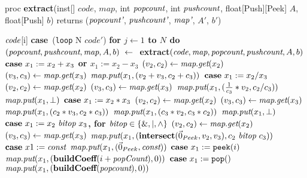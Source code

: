 \begin{algorithm}
proc {\bf extract}(inst[] $code$, \maptype $map$, int $\mbox{\it popcount}$, int $\mbox{\it pushcount}$, 
float[Push][Peek] $A$, float[Push] $b$) 
returns ($\mbox{\it popcount'}$, $\mbox{\it pushcount'}$, $\mbox{\it map'}$, $A'$, $b'$)
\begin{algorithmic}
 $\mbox{\it code}$[i]
\IND
\STATE \mbox{\bf case}~({\tt loop} N $code'$)
\IND
\STATE \bf{for} $j \leftarrow 1$ to $N$ {\bf do}
\IND
\STATE $(\mbox{\it popcount}, \mbox{\it pushcount}, \mbox{\it map}, A, b)~\leftarrow~$ \bf{extract}$(\mbox{\it code}, \mbox{\it map}, \mbox{\it popcount}, \mbox{\it pushcount}, A, b)$
\UND
\UND
\STATE \vspace{-6pt}
\STATE $\mbox{\bf case}~ x_1 := x_2 + x_3$ or $x_1 := x_2 - x_3$
\IND
\STATE $(v_2, c_2) \leftarrow \mbox{\it map}.\mbox{\it get}(x_2)$
\STATE $(v_3, c_3) \leftarrow \mbox{\it map}.\mbox{\it get}(x_3)$
\STATE $\mbox{\it map}.\mbox{\it put}(x_1, (v_2+v_3, c_2+c_3))$
\UND
\STATE \vspace{-6pt}
\STATE $\mbox{\bf case}~x_1 := x_2 / x_3$
\IND
\STATE $(v_2, c_2) \leftarrow \mbox{\it map}.\mbox{\it get}(x_2)$
\STATE $(v_3, c_3) \leftarrow \mbox{\it map}.\mbox{\it get}(x_3)$
\STATE $\mbox{\it map}.\mbox{\it put}(x_1, (\frac{1}{c_3}*v_2, c_2/c_3))$
\ELSE
\STATE $\mbox{\it map}.\mbox{\it put}(x_1, \bot)$
\ENDIF
\UND
\STATE \vspace{-6pt}
\STATE $\mbox{\bf case}~x_1 := x_2 * x_3$
\IND
\STATE $(v_2, c_2) \leftarrow \mbox{\it map}.\mbox{\it get}(x_2)$
\STATE $(v_3, c_3) \leftarrow \mbox{\it map}.\mbox{\it get}(x_3)$
\STATE $\mbox{\it map}.\mbox{\it put}(x_1, (c_2*v_3, c_2*c_3))$
\STATE $\mbox{\it map}.\mbox{\it put}(x_1, (c_3*v_2, c_3*c_2))$
\ELSE
\STATE $\mbox{\it map}.\mbox{\it put}(x_1, \bot)$
\ENDIF
\UND
\STATE \vspace{-6pt}
\STATE $\mbox{\bf case}~x_1 := x_2 ~\mbox{\it bitop}~ x_3$, for $\mbox{\it bitop} \in \{\&, |, \wedge\}$
\IND
\STATE $(v_2, c_2) \leftarrow \mbox{\it map}.\mbox{\it get}(x_2)$
\STATE $(v_3, c_3) \leftarrow \mbox{\it map}.\mbox{\it get}(x_3)$
\STATE $\mbox{\it map}.\mbox{\it put}(x_1, (\mbox{\bf intersect}(\vec 0_{Peek}, v_2, v_3), c_2 ~\mbox{\it bitop}~ c_3))$
\UND
\STATE \vspace{-6pt}
\STATE $\mbox{\bf case}~x1 := \mbox{\it const}$
\IND
\STATE $\mbox{\it map}.\mbox{\it put}(x_1, (\vec 0_{Peek}, \mbox{\it const}))$
\UND
\STATE \vspace{-6pt}
\STATE $\mbox{\bf case}~x_1 := \mbox{\tt peek}(i)$
\IND
\STATE $\mbox{\it map}.\mbox{\it put}(x_1, (\mbox{\bf buildCoeff}(i+\mbox{\it popCount}), 0))$
\UND
\STATE
\STATE $\mbox{\bf case}~x_1 := \mbox{\tt pop}()$
\IND
\STATE $\mbox{\it map}.\mbox{\it put}(x_1, (\mbox{\bf buildCoeff}(\mbox{\it popcount}), 0))$

\end{algorithmic}
\end{algorithm}
